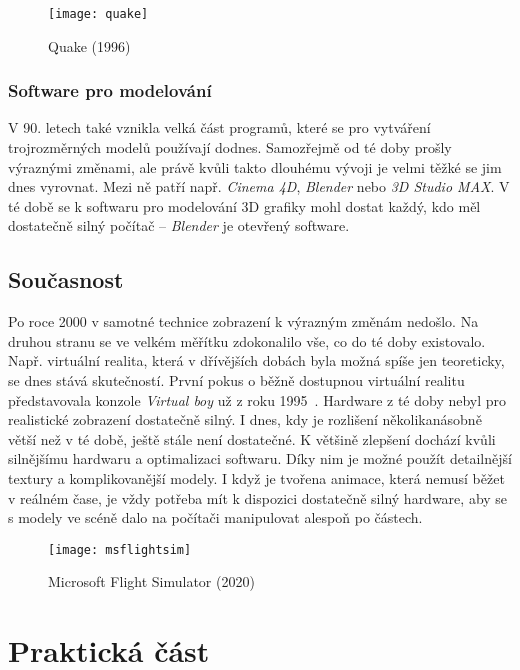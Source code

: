 \documentclass[a4paper, 11pt]{report}
\begin{document}
\begin{chapterwithoutpagebreak}
\begin{figure}[h]
    \centering
    \texttt{[image: quake]}
    \caption[Quake (1996)]{Quake (1996)~\cite{pic:quake}}
\end{figure}

\section{Software pro modelování}
V 90. letech také vznikla velká část programů, které se pro vytváření trojrozměrných modelů používají dodnes. Samozřejmě od té doby prošly výraznými změnami, ale právě kvůli takto dlouhému vývoji je velmi těžké se jim dnes vyrovnat. Mezi ně patří např. \emph{Cinema 4D}, \emph{Blender} nebo \emph{3D Studio MAX}. V té době se k softwaru pro modelování 3D grafiky mohl dostat každý, kdo měl dostatečně silný počítač -- \emph{Blender} je otevřený software.

\chapter{Současnost}
Po roce 2000 v samotné technice zobrazení k výrazným změnám nedošlo. Na druhou stranu se ve velkém měřítku zdokonalilo vše, co do té doby existovalo. Např. virtuální realita, která v dřívějších dobách byla možná spíše jen teoreticky, se dnes stává skutečností. První pokus o běžně dostupnou virtuální realitu představovala konzole \emph{Virtual boy} už z roku 1995~\cite{nintendowiki:virtualboy}. Hardware z té doby nebyl pro realistické zobrazení dostatečně silný. I dnes, kdy je rozlišení několikanásobně větší než v té době, ještě stále není dostatečné. K většině zlepšení dochází kvůli silnějšímu hardwaru a optimalizaci softwaru. Díky nim je možné použít detailnější textury a komplikovanější modely. I když je tvořena animace, která nemusí běžet v reálném čase, je vždy potřeba mít k dispozici dostatečně silný hardware, aby se s modely ve scéně dalo na počítači manipulovat alespoň po částech.

\begin{figure}[H]
    \centering
    \texttt{[image: msflightsim]}
    \caption[Microsoft Flight Simulator (2020)]{Microsoft Flight Simulator (2020)~\cite{pic:msflightsim}}
\end{figure}

\end{chapterwithoutpagebreak}
\part{Praktická část}
\end{document}
